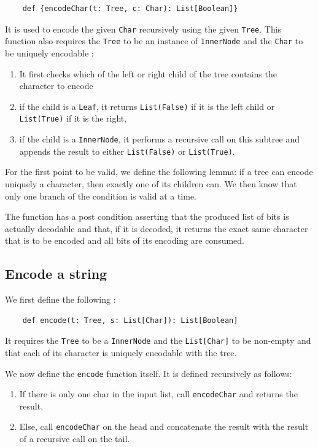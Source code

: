 \documentclass[a4paper,UKenglish,cleveref, autoref, thm-restate]{lipics-v2021}
\begin{document}
\begin{lstlisting}
    def {encodeChar(t: Tree, c: Char): List[Boolean]} 
\end{lstlisting}

It is used to encode the given \lstinline{Char} recursively using the given \lstinline{Tree}. This function also requires the \lstinline{Tree} to be an instance of \lstinline{InnerNode} 
and the \lstinline{Char} to be uniquely encodable :

\begin{enumerate}
    \item It first checks which of the left or right child of the tree contains the character to encode
    \item if the child is a \lstinline{Leaf}, it returns \lstinline{List(False)} if it is the left child or \lstinline{List(True)} if it is the right,
    \item if the child is a \lstinline{InnerNode}, it performs a recursive call on this subtree and appends the result to either \lstinline{List(False)} or \lstinline{List(True)}.
\end{enumerate}

For the first point to be valid, we define the following lemma: if a tree can encode uniquely a character, then exactly one of its children can. We then know that only one branch of the condition is valid at a time.

The function has a post condition asserting that the produced list of bits is actually decodable and that, if it is decoded, it returns the exact same character that is to be encoded and all bits of its encoding are consumed.

\subsection{Encode a string}
We first define the following :

\begin{lstlisting}
    def encode(t: Tree, s: List[Char]): List[Boolean]
\end{lstlisting}

It requires the \lstinline{Tree} to be a \lstinline{InnerNode} and  the \lstinline{List[Char]} to be non-empty and that each of its character is uniquely encodable with the tree.

We now define the \lstinline{encode} function itself. It is defined recursively as follows:
\begin{enumerate}
    \item If there is only one char in the input list, call \lstinline{encodeChar} and returns the result.
    \item Else, call \lstinline{encodeChar} on the head and concatenate the result with the result of a recursive call on the tail.
\end{enumerate}
\end{document}
